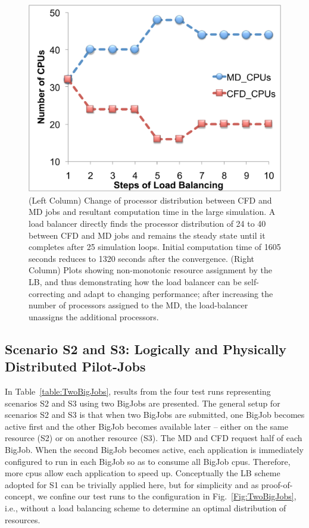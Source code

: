 \documentclass[conference,final]{IEEEtran}
\newcommand{\jhanote}[1]{ {\textcolor{red} { ***Jha: #1 }}}
\newcommand{\jhanote}[1]{}
\begin{document}
\begin{figure}
\includegraphics[scale=0.21]{fig7_22.pdf}
\caption{\small (Left Column) Change of processor distribution between
  CFD and MD jobs and resultant computation time in the large
  simulation. A load balancer directly finds the processor
  distribution of 24 to 40 between CFD and MD jobs and remains the
  steady state until it completes after 25 simulation loops. Initial
  computation time of 1605 seconds reduces to 1320 seconds after the
  convergence. (Right Column) Plots showing non-monotonic resource
  assignment by the LB, and thus demonstrating how the load balancer
  can be self-correcting and adapt to changing performance; after
  increasing the number of processors assigned to the MD, the
  load-balancer unassigns the additional processors.}
\label{Fig:LBLarge}
\end{figure}




\subsection{Scenario S2 and S3: Logically and Physically Distributed
  Pilot-Jobs}

In Table~\ref{table:TwoBigJobs}, results from the four test runs
representing scenarios S2 and S3 using two BigJobs are presented.  The
general setup for scenarios S2 and S3 is that when two BigJobs are
submitted, one BigJob becomes active first and the other BigJob
becomes available later -- either on the same resource (S2) or on
another resource (S3).  The MD and CFD request half of each
BigJob. When the second BigJob becomes active, each application is
immediately configured to run in each BigJob so as to consume all
BigJob cpus. Therefore, more cpus allow each application to speed
up. Conceptually the LB scheme adopted for S1 can be trivially applied
here, but for simplicity and as proof-of-concept, we confine our test
runs to the configuration in Fig.~\ref{Fig:TwoBigJobs}, i.e., without
a load balancing scheme to determine an optimal distribution of
resources.
\end{document}
